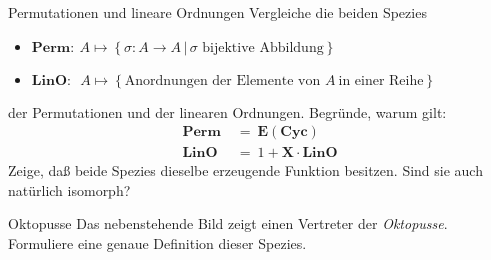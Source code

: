 \documentclass{pizzablatt}
\begin{document}

\begin{aufgabe}{Permutationen und lineare Ordnungen}
Vergleiche die beiden Spezies
\begin{itemize}
\item $\textbf{Perm} :\  A \longmapsto \left\{\sigma: A \longrightarrow A \,|\, \text{$\sigma$ bijektive Abbildung}\right\}$
\item $\textbf{LinO}: \ \;A \longmapsto \left\{\text{Anordnungen der Elemente von }A\ \text{in einer Reihe}\right\}$
\end{itemize}
der Permutationen und der linearen Ordnungen. Begründe, warum gilt:
\begin{align*}
\textbf{Perm}\ &=\ \textbf{E}(\textbf{Cyc}) \\
\textbf{LinO} \ \; &=\ 1 + \textbf{X}\cdot \textbf{LinO}  
\end{align*}
Zeige, daß beide Spezies dieselbe erzeugende Funktion besitzen. Sind sie auch
natürlich isomorph?
\end{aufgabe}

\begin{aufgabe}{Oktopusse}
Das nebenstehende Bild zeigt einen Vertreter der \emph{Oktopusse}.
\\
Formuliere eine genaue Definition dieser Spezies.
\marginpar{%
    \vspace*{-5em}%
    \hspace*{-10em}\texttt{[image: oktopus.png]}}
\end{aufgabe}
\end{document}
